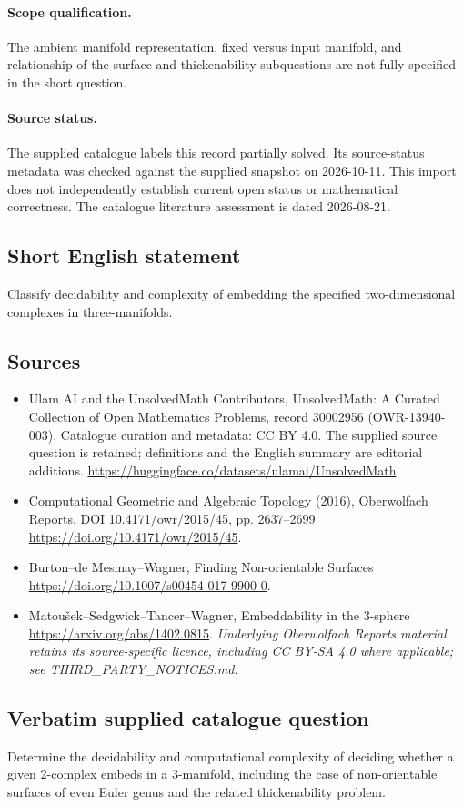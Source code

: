 \documentclass[11pt]{article}
\begin{document}
\paragraph{Scope qualification.}
The ambient manifold representation, fixed versus input manifold, and relationship of the surface and thickenability subquestions are not fully specified in the short question.
\paragraph{Source status.}
The supplied catalogue labels this record partially solved. Its source-status metadata was checked against the supplied snapshot on 2026-10-11. This import does not independently establish current open status or mathematical correctness. The catalogue literature assessment is dated 2026-08-21.
\subsection{Short English statement}
Classify decidability and complexity of embedding the specified two-dimensional complexes in three-manifolds.
\subsection{Sources}
\begin{itemize}
\item[S1] Ulam AI and the UnsolvedMath Contributors, UnsolvedMath: A Curated Collection of Open Mathematics Problems, record 30002956 (OWR-13940-003). Catalogue curation and metadata: CC BY 4.0. The supplied source question is retained; definitions and the English summary are editorial additions.
\url{https://huggingface.co/datasets/ulamai/UnsolvedMath}.
\item[S2] Computational Geometric and Algebraic Topology (2016), Oberwolfach Reports, DOI 10.4171/owr/2015/45, pp. 2637--2699
\url{https://doi.org/10.4171/owr/2015/45}.
\item[S3] Burton--de Mesmay--Wagner, Finding Non-orientable Surfaces
\url{https://doi.org/10.1007/s00454-017-9900-0}.
\item[S4] Matoušek--Sedgwick--Tancer--Wagner, Embeddability in the 3-sphere
\url{https://arxiv.org/abs/1402.0815}.
\textit{Underlying Oberwolfach Reports material retains its source-specific licence, including CC BY-SA 4.0 where applicable; see THIRD\_PARTY\_NOTICES.md.}
\end{itemize}
\subsection{Verbatim supplied catalogue question}
Determine the decidability and computational complexity of deciding whether a given 2-complex embeds in a 3-manifold, including the case of non-orientable surfaces of even Euler genus and the related thickenability problem.
\end{document}
